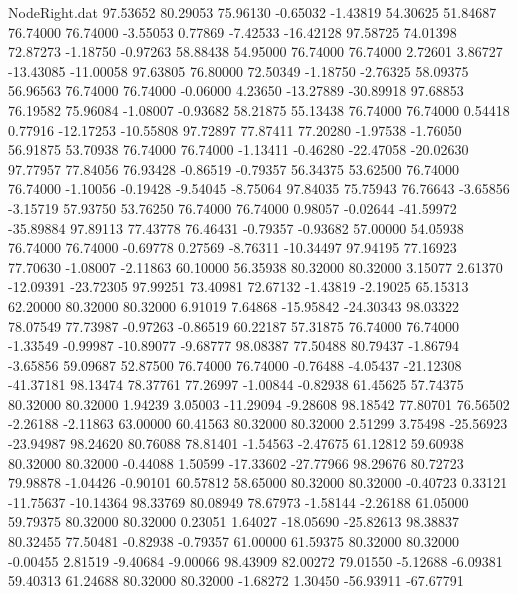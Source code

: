 \begin{filecontents}{NodeRight.dat}
  97.53652   80.29053   75.96130    -0.65032   -1.43819   54.30625   51.84687   76.74000   76.74000   -3.55053    0.77869   -7.42533  -16.42128
  97.58725   74.01398   72.87273    -1.18750   -0.97263   58.88438   54.95000   76.74000   76.74000    2.72601    3.86727  -13.43085  -11.00058
  97.63805   76.80000   72.50349    -1.18750   -2.76325   58.09375   56.96563   76.74000   76.74000   -0.06000    4.23650  -13.27889  -30.89918
  97.68853   76.19582   75.96084    -1.08007   -0.93682   58.21875   55.13438   76.74000   76.74000    0.54418    0.77916  -12.17253  -10.55808
  97.72897   77.87411   77.20280    -1.97538   -1.76050   56.91875   53.70938   76.74000   76.74000   -1.13411   -0.46280  -22.47058  -20.02630
  97.77957   77.84056   76.93428    -0.86519   -0.79357   56.34375   53.62500   76.74000   76.74000   -1.10056   -0.19428   -9.54045   -8.75064
  97.84035   75.75943   76.76643    -3.65856   -3.15719   57.93750   53.76250   76.74000   76.74000    0.98057   -0.02644  -41.59972  -35.89884
  97.89113   77.43778   76.46431    -0.79357   -0.93682   57.00000   54.05938   76.74000   76.74000   -0.69778    0.27569   -8.76311  -10.34497
  97.94195   77.16923   77.70630    -1.08007   -2.11863   60.10000   56.35938   80.32000   80.32000    3.15077    2.61370  -12.09391  -23.72305
  97.99251   73.40981   72.67132    -1.43819   -2.19025   65.15313   62.20000   80.32000   80.32000    6.91019    7.64868  -15.95842  -24.30343
  98.03322   78.07549   77.73987    -0.97263   -0.86519   60.22187   57.31875   76.74000   76.74000   -1.33549   -0.99987  -10.89077   -9.68777
  98.08387   77.50488   80.79437    -1.86794   -3.65856   59.09687   52.87500   76.74000   76.74000   -0.76488   -4.05437  -21.12308  -41.37181
  98.13474   78.37761   77.26997    -1.00844   -0.82938   61.45625   57.74375   80.32000   80.32000    1.94239    3.05003  -11.29094   -9.28608
  98.18542   77.80701   76.56502    -2.26188   -2.11863   63.00000   60.41563   80.32000   80.32000    2.51299    3.75498  -25.56923  -23.94987
  98.24620   80.76088   78.81401    -1.54563   -2.47675   61.12812   59.60938   80.32000   80.32000   -0.44088    1.50599  -17.33602  -27.77966
  98.29676   80.72723   79.98878    -1.04426   -0.90101   60.57812   58.65000   80.32000   80.32000   -0.40723    0.33121  -11.75637  -10.14364
  98.33769   80.08949   78.67973    -1.58144   -2.26188   61.05000   59.79375   80.32000   80.32000    0.23051    1.64027  -18.05690  -25.82613
  98.38837   80.32455   77.50481    -0.82938   -0.79357   61.00000   61.59375   80.32000   80.32000   -0.00455    2.81519   -9.40684   -9.00066
  98.43909   82.00272   79.01550    -5.12688   -6.09381   59.40313   61.24688   80.32000   80.32000   -1.68272    1.30450  -56.93911  -67.67791

\end{filecontents}
